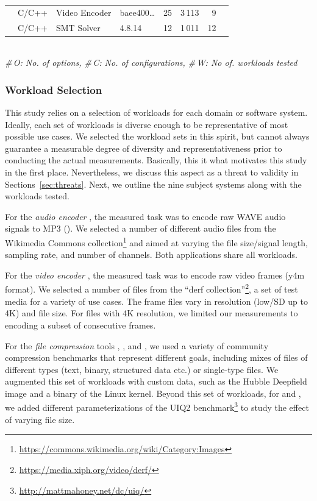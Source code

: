 {{\begin{table}
\begin{tabular}{p{1.1cm}p{0.6cm}p{1.9cm}p{0.99cm}p{0.2cm}rrr}
	\xzwo & C/C++ & Video Encoder & baee400\ldots & 25 & 3\,113 & 9  \\
	\zdrei & C/C++ & SMT Solver & 4.8.14 & 12 & 1\,011 & 12  \\
	
	\bottomrule
	
\end{tabular}\\
{\centering\vspace{1mm}\textit{\#\,O: No. of options, \#\,C: No. of configurations, \#\,W: No of. workloads tested}}
	

	\label{tab:subject_systems}
\end{table}

\subsubsection{Workload Selection}
This study relies on a selection of workloads for each domain or software system. Ideally, each set of workloads is diverse enough to be representative of most possible use cases. We selected the workload sets in this spirit, but cannot always guarantee a measurable degree of diversity and representativeness prior to conducting the actual measurements. Basically, this it what motivates this study in the first place. Nevertheless, we discuss this aspect as a threat to validity in Sections~\ref{sec:threats}. Next, we outline the nine subject systems along with the workloads tested. 

For the \textit{audio encoder} \jumper, the measured task was to encode raw WAVE audio signals to MP3 (\jumper). We selected a number of different audio files from the Wikimedia Commons collection\footnote{\url{https://commons.wikimedia.org/wiki/Category:Images}} and aimed at varying the file size/signal length, sampling rate, and number of channels. Both applications share all workloads.

For the \textit{video encoder} \xzwo, the measured task was to encode raw video frames (y4m format). We selected a number of files from the “derf collection”\footnote{\url{https://media.xiph.org/video/derf/}}, a set of test media for a variety of use cases. The frame files vary in resolution (low/SD up to 4K) and file size. For files with 4K resolution, we limited our measurements to encoding a subset of consecutive frames.

For the \textit{file compression} tools \kanzi, \xz, and \lrzip, we used a variety of community compression benchmarks that represent different goals, including mixes of files of different types (text, binary, structured data etc.) or single-type files. We augmented this set of workloads with custom data, such as the Hubble Deepfield image and a binary of the Linux kernel. Beyond this set of workloads, for \xz and \lrzip, we added different parameterizations of the UIQ2 benchmark\footnote{\url{http://mattmahoney.net/dc/uiq/}} to study the effect of varying file size. 

}}
